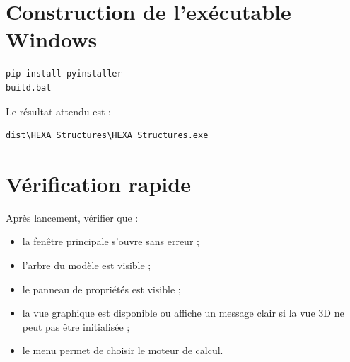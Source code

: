 \section{Construction de l'exécutable Windows}

\begin{verbatim}
pip install pyinstaller
build.bat
\end{verbatim}

Le résultat attendu est :

\begin{verbatim}
dist\HEXA Structures\HEXA Structures.exe
\end{verbatim}

\section{Vérification rapide}

Après lancement, vérifier que :

\begin{itemize}
  \item la fenêtre principale s'ouvre sans erreur ;
  \item l'arbre du modèle est visible ;
  \item le panneau de propriétés est visible ;
  \item la vue graphique est disponible ou affiche un message clair si la vue
  3D ne peut pas être initialisée ;
  \item le menu  permet de choisir le moteur de calcul.
\end{itemize}

